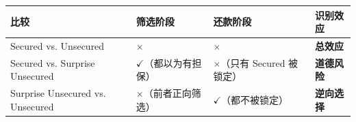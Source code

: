 \begin{table}
  \centering
  \scriptsize
  \begin{tabular}{p{3.7cm} p{2.2cm} p{2.5cm} p{2.0cm}}
    \toprule
    \textbf{比较} & \textbf{筛选阶段} & \textbf{还款阶段} & \textbf{识别效应} \\
    \midrule
    Secured vs. Unsecured & $\times$ & $\times$ & \textbf{总效应} \\
    Secured vs. Surprise Unsecured & $\checkmark$（都以为有担保） & $\times$（只有 Secured 被锁定） & \textbf{道德风险} \\
    Surprise Unsecured vs. Unsecured & $\times$（前者正向筛选） & $\checkmark$（都不被锁定） & \textbf{逆向选择} \\
    \bottomrule
  \end{tabular}
\end{table}
